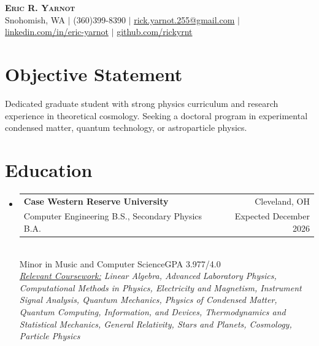 \documentclass[letterpaper,11pt]{article}
\makeatletter
\newcommand{\resumeSubheading}[4]{
  \vspace{-2pt}\item
    \begin{tabular*}{0.97\textwidth}[t]{l@{\extracolsep{\fill}}r}
      \textbf{#1} & #2 \\
      {\small#3} & {\small #4} \\
    \end{tabular*}\vspace{-7pt}
}
\newcommand{\resumeSubHeadingListStart}{\begin{itemize}[leftmargin=0.15in, label={}]}
\newcommand{\resumeSubHeadingListEnd}{\end{itemize}}
\makeatother
\begin{document}

\begin{center}
    \textbf{\LARGE \scshape Eric R. Yarnot} \\ \vspace{5pt}
    \small Snohomish, WA $|$ (360)399-8390 $|$ \href{mailto:rick.yarnot.255@gmail.com}{rick.yarnot.255@gmail.com} $|$ 
    \href{https://linkedin.com/in/eric-yarnot/}{linkedin.com/in/eric-yarnot} $|$ \href{https://github.com/rickyrnt/}{github.com/rickyrnt}
\end{center}

\section{Objective Statement}
Dedicated graduate student with strong physics curriculum and research experience in theoretical cosmology. Seeking a doctoral program in experimental condensed matter, quantum technology, or astroparticle physics.

\section{Education}
  \resumeSubHeadingListStart
    \resumeSubheading
      {Case Western Reserve University}{Cleveland, OH}
      {Computer Engineering B.S., Secondary Physics B.A.}{Expected December 2026}
      \vspace{2pt} \\
      \small{Minor in Music and Computer Science}\hfill GPA 3.977/4.0
      \vspace{2pt} \\
      \small{\textit{\underline{Relevant Coursework:} 
        Linear Algebra, 
        Advanced Laboratory Physics, 
        Computational Methods in Physics, 
        Electricity and Magnetism, 
        Instrument Signal Analysis, 
        Quantum Mechanics, 
        Physics of Condensed Matter, 
        Quantum Computing, Information, and Devices, 
        Thermodynamics and Statistical Mechanics,
        General Relativity, 
        Stars and Planets, 
        Cosmology, 
        Particle Physics 
        }
      }
  \resumeSubHeadingListEnd
\end{document}

